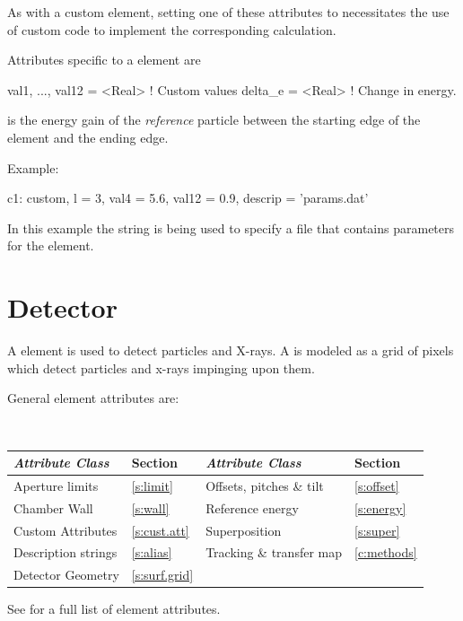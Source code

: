 As with a custom element, setting one of these attributes to
 necessitates the use of custom code to implement the
corresponding calculation.

Attributes specific to a  element are
\begin{example}
  val1, ..., val12 = <Real>  ! Custom values 
  delta_e          = <Real>  ! Change in energy.
\end{example}

 is the energy gain of the {\it reference} particle
between the starting edge of the element and the ending edge.

Example:
\begin{example}
  c1: custom, l = 3, val4 = 5.6, val12 = 0.9, descrip = 'params.dat'
\end{example}
In this example the  string is being used to specify a
file that contains parameters for the element.

\section{Detector}
\label{s:detector}

A  element is used to detect particles and X-rays.  A
 is modeled as a grid of pixels which detect particles and x-rays
impinging upon them.

General  element attributes are:
\begin{center}
\tt 
\begin{tabular}{llll} \toprule
  {\sl Attribute Class}      & Section           & {\sl Attribute Class}      & Section         \\ \midrule
  Aperture limits            & \ref{s:limit}     & Offsets, pitches \& tilt   & \ref{s:offset}  \\
  Chamber Wall               & \ref{s:wall}      & Reference energy           & \ref{s:energy}  \\
  Custom Attributes          & \ref{s:cust.att}  & Superposition              & \ref{s:super}   \\
  Description strings        & \ref{s:alias}     & Tracking \& transfer map   & \ref{c:methods} \\
  Detector Geometry          & \ref{s:surf.grid} &                            &                 \\
  \bottomrule
\end{tabular}
\end{center}
\toffset
See  for a full list of element attributes.

